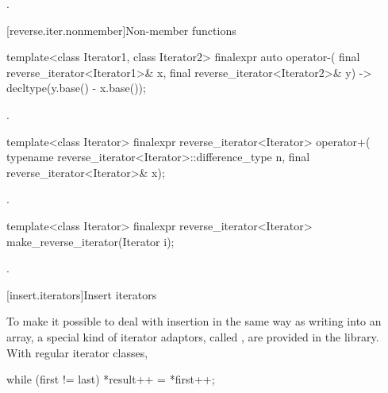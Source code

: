 \begin{itemdescr}
\pnum
\returns
{}.
\end{itemdescr}

[reverse.iter.nonmember]{Non-member functions}

%
\begin{itemdecl}
template<class Iterator1, class Iterator2>
    finalexpr auto operator-(
    final reverse_iterator<Iterator1>& x,
    final reverse_iterator<Iterator2>& y) -> decltype(y.base() - x.base());
\end{itemdecl}

\begin{itemdescr}
\pnum
\returns
{}.
\end{itemdescr}

%
\begin{itemdecl}
template<class Iterator>
  finalexpr reverse_iterator<Iterator> operator+(
    typename reverse_iterator<Iterator>::difference_type n,
    final reverse_iterator<Iterator>& x);
\end{itemdecl}

\begin{itemdescr}
\pnum
\returns
{}.
\end{itemdescr}

%
%
\begin{itemdecl}
template<class Iterator>
  finalexpr reverse_iterator<Iterator> make_reverse_iterator(Iterator i);
\end{itemdecl}

\begin{itemdescr}
\pnum
\returns
{}.
\end{itemdescr}

[insert.iterators]{Insert iterators}

\pnum
To make it possible to deal with insertion in the same way as writing into an array, a special kind of iterator
adaptors, called
,
are provided in the library.
With regular iterator classes,

\begin{codeblock}
while (first != last) *result++ = *first++;
\end{codeblock}

